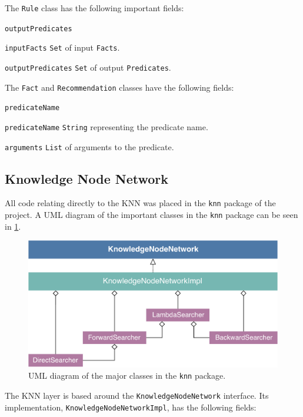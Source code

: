 \documentclass[titlepage,11pt]{article}
\newcommand{\code}[1]{\texttt{#1}}
\begin{document}
The \code{Rule} class has the following important fields:

\begin{labeling}{\code{outputPredicates}}
	\item[\code{inputFacts}] \code{Set} of input \code{Facts}.
	\item[\code{outputPredicates}] \code{Set} of output \code{Predicates}.
\end{labeling}

The \code{Fact} and \code{Recommendation} classes have the following fields:

\begin{labeling}{\code{predicateName}}
	\item[\code{predicateName}] \code{String} representing the predicate name.
	\item[\code{arguments}] \code{List} of arguments to the predicate.
\end{labeling}

\subsection{Knowledge Node Network}

All code relating directly to the KNN was placed in the \code{knn} package of the project. A UML diagram of the important classes in the \code{knn} package can be seen in \cref{fig:uml_knn}.

\begin{figure}[!htb]
	\includegraphics[width=\columnwidth]{figures/uml_knn.pdf}
	\caption{UML diagram of the major classes in the \code{knn} package.}
	\label{fig:uml_knn}
\end{figure}

The KNN layer is based around the \code{KnowledgeNodeNetwork} interface. Its implementation, \code{KnowledgeNodeNetworkImpl}, has the following fields:
\end{document}
